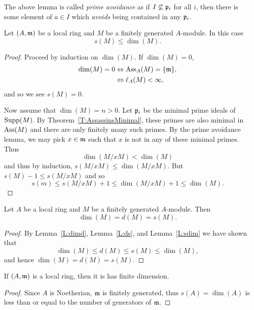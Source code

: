 \documentclass{ximera}
\begin{document}
\begin{remark}
  The above lemma is called \textit{prime avoidance} as if
  $I\not\subseteq \mathfrak{p}_i$ for all $i$, then there is some element of $a
  \in I$ which \textit{avoids} being contained in any $\mathfrak{p}_i$.
\end{remark}




\begin{lemma}\label{L:sdim}
  Let $(A,\mathfrak{m})$ be a local ring and $M$ be a finitely generated
  $A$-module. In this case
  \[
  s(M)\le \dim(M).
  \]
  \begin{proof}
    Proceed by induction on $\dim(M)$. If $\dim(M) = 0$,
    \begin{align*}
      \dim(M) = 0 &\Leftrightarrow \operatorname{Ass}_A(M)=\{\mathfrak{m}\}, \\
      &\Leftrightarrow \ell_A(M) <\infty,
    \end{align*}
    and so we see $s(M) = 0$.
    
    Now assume that $\dim(M)=n>0$. Let $\mathfrak{p}_i$ be the minimal prime
    ideals of $\operatorname{Supp}(M)$. By Theorem~\ref{T:AssassinsMinimal}, these
    primes are also minimal in $\operatorname{Ass}(M)$ and there are only finitely
    many such primes. By the prime avoidance
    lemma, we may pick $x\in\mathfrak{m}$ such that $x$ is not in any of these
    minimal primes. Thus
    \[
    \dim(M/xM) <\dim(M)
    \]
    and thus by induction, $s(M/xM)\le\dim(M/xM)$. But $s(M)-1\le s(M/xM)$ and so
    \[
    s(m) \le s(M/xM) +1 \le \dim(M/xM) +1 \le \dim(M).
    \]
  \end{proof}
\end{lemma}



\begin{theorem}\label{T:dimension}
  Let $A$ be a local ring and $M$ be a finitely generated
  $A$-module. Then
  \[
  \dim(M) = d(M) = s(M).
  \]
  \begin{proof}
    By Lemma~\ref{L:dimd}, Lemma~\ref{L:ds}, and Lemma~\ref{L:sdim} we have shown that
    \[
    \dim(M)\le d(M) \le s(M) \le \dim(M),
    \]
    and hence $\dim(M) = d(M) = s(M)$.
  \end{proof}
\end{theorem}



\begin{corollary}
  If $(A,\mathfrak{m})$ is a local ring, then it is has finite dimension.
  \begin{proof}
    Since $A$ is Noetherian, $\mathfrak{m}$ is finitely generated, thus
    $s(A)=\dim(A)$ is less than or equal to the number of generators of
    $\mathfrak{m}$.
  \end{proof}
\end{corollary}
\end{document}
